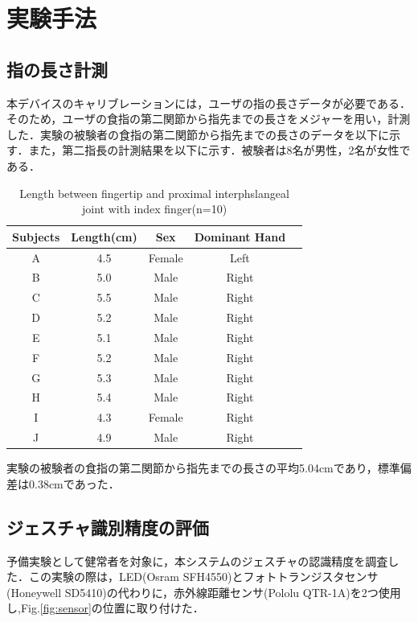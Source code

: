 \chapter{実験手法}

\section{指の長さ計測}
本デバイスのキャリブレーションには，ユーザの指の長さデータが必要である．そのため，ユーザの食指の第二関節から指先までの長さをメジャーを用い，計測した．実験の被験者の食指の第二関節から指先までの長さのデータを以下に示す．また，第二指長の計測結果を以下に示す．被験者は8名が男性，2名が女性である．

\begin{table}[H]
  \caption{Length between fingertip and proximal interphslangeal joint with index finger(n=10)}
  \label{table:finger_distance}
  \centering
  \begin{tabular}{ccccc}
    \hline
    Subjects & Length(cm) & Sex & Dominant Hand\\
    \hline \hline 
    A  & 4.5 & Female & Left\\
    B  & 5.0 & Male & Right\\
    C  & 5.5 & Male & Right\\
    D  & 5.2 & Male & Right\\
    E  & 5.1 & Male & Right\\ 
    F  & 5.2 & Male & Right\\
    G  & 5.3 & Male & Right\\
    H  & 5.4 & Male & Right\\
    I  & 4.3 & Female & Right\\
    J  & 4.9 & Male & Right\\
    \hline
  \end{tabular}
\end{table}

実験の被験者の食指の第二関節から指先までの長さの平均5.04cmであり，標準偏差は0.38cmであった．

\section{ジェスチャ識別精度の評価}
予備実験として健常者を対象に，本システムのジェスチャの認識精度を調査した．この実験の際は，LED(Osram SFH4550)とフォトトランジスタセンサ(Honeywell SD5410)の代わりに，赤外線距離センサ(Pololu QTR-1A)を2つ使用し,Fig.\ref{fig:sensor}の位置に取り付けた．


